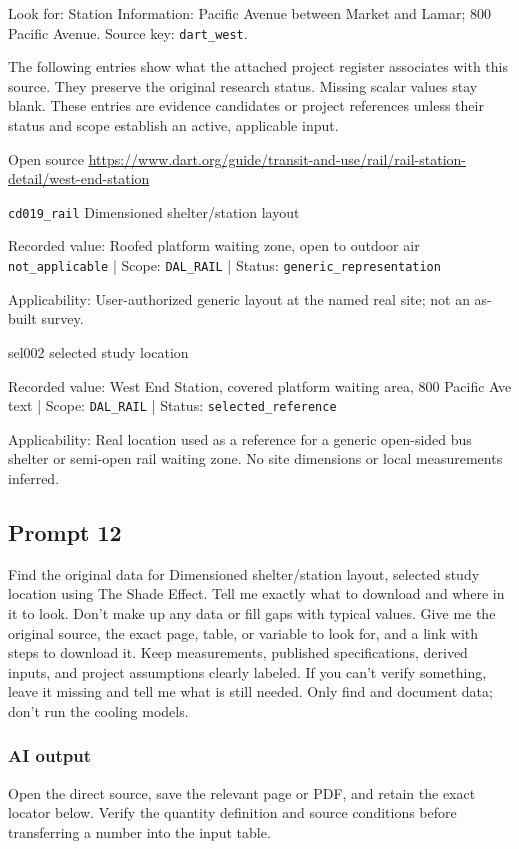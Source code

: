 Look for: Station Information: Pacific Avenue between Market and Lamar; 800 Pacific Avenue. Source key: \nolinkurl{dart_west}.

The following entries show what the attached project register associates with this source. They preserve the original research status. Missing scalar values stay blank. These entries are evidence candidates or project references unless their status and scope establish an active, applicable input.

Open source  \url{https://www.dart.org/guide/transit-and-use/rail/rail-station-detail/west-end-station}

\nolinkurl{cd019_rail}  Dimensioned shelter/station layout

Recorded value: Roofed platform waiting zone, open to outdoor air \nolinkurl{not_applicable} | Scope: \nolinkurl{DAL_RAIL} | Status: \nolinkurl{generic_representation}

Applicability: User-authorized generic layout at the named real site; not an as-built survey.

sel002  selected study location

Recorded value: West End Station, covered platform waiting area, 800 Pacific Ave text | Scope: \nolinkurl{DAL_RAIL} | Status: \nolinkurl{selected_reference}

Applicability: Real location used as a reference for a generic open-sided bus shelter or semi-open rail waiting zone. No site dimensions or local measurements inferred.

\subsection*{Prompt 12}
Find the original data for Dimensioned shelter/station layout, selected study location using The Shade Effect. Tell me exactly what to download and where in it to look. Don’t make up any data or fill gaps with typical values. Give me the original source, the exact page, table, or variable to look for, and a link with steps to download it. Keep measurements, published specifications, derived inputs, and project assumptions clearly labeled. If you can’t verify something, leave it missing and tell me what is still needed. Only find and document data; don’t run the cooling models.

\subsubsection*{AI output}
Open the direct source, save the relevant page or PDF, and retain the exact locator below. Verify the quantity definition and source conditions before transferring a number into the input table.

